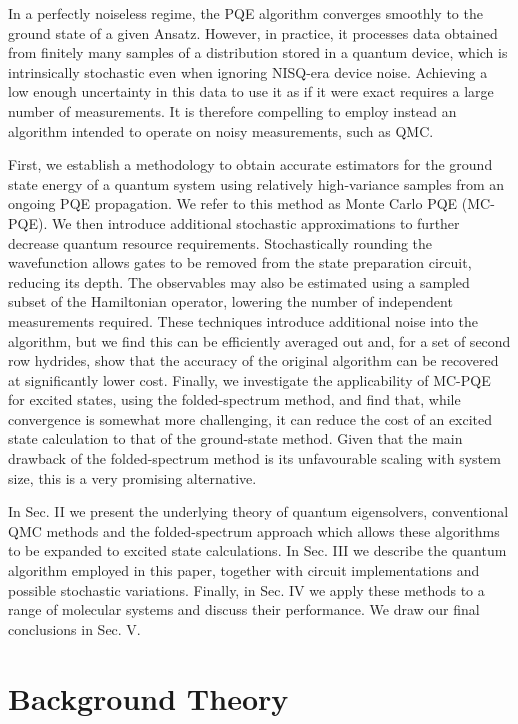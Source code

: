 \documentclass[%
 reprint,
 amsmath,amssymb,
 aps,
]{revtex4-2}
\begin{document}
{ In a perfectly noiseless regime, the PQE algorithm converges smoothly to the ground state of a given Ansatz. However, in practice, it processes data obtained from finitely many samples of a distribution stored in a quantum device, which is intrinsically stochastic even when ignoring NISQ-era device noise. Achieving a low enough uncertainty in this data to use it as if it were exact requires a large number of measurements. It is therefore compelling to employ instead an algorithm intended to operate on noisy measurements, such as QMC.} 

First, we establish a methodology to obtain accurate estimators for the ground state energy of a quantum system using relatively high-variance samples from an ongoing PQE propagation. We refer to this method as Monte Carlo PQE (MC-PQE). We then introduce additional stochastic approximations to further decrease quantum resource requirements. Stochastically rounding the wavefunction allows gates to be removed from the state preparation circuit, reducing its depth. The observables may also be estimated using a sampled subset of the Hamiltonian operator, lowering the number of independent measurements required. These techniques introduce additional noise into the algorithm, but we find this can be efficiently averaged out and, for a set of second row hydrides, show that the accuracy of the original algorithm can be recovered at significantly lower cost. 
Finally, we investigate the applicability of MC-PQE for excited states, using the folded-spectrum method, \cite{Peruzzo2014,Cao2019,CadiTazi2023} and find that, while convergence is somewhat more challenging, it can reduce the cost of an excited state calculation to that of the ground-state method. Given that the main drawback of the folded-spectrum method is its unfavourable scaling with system size, this is a very promising alternative.

In Sec. II we present the underlying theory of quantum eigensolvers, conventional QMC methods and the folded-spectrum approach which allows these algorithms to be expanded to excited state calculations. In Sec. III we describe the quantum algorithm employed in this paper, together with circuit implementations and possible stochastic variations. Finally, in Sec. IV we apply these methods to a range of molecular systems and discuss their performance. We draw our final conclusions in Sec. V.

\section{Background Theory}
\end{document}
